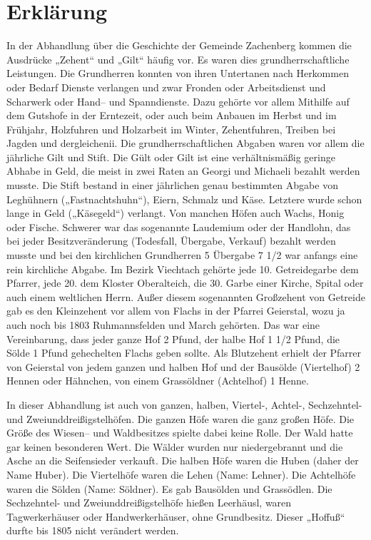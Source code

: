 \documentclass{book}
\begin{document}
\part{Erklärung}

In der Abhandlung über die Geschichte der Gemeinde Zachenberg kommen die
Ausdrücke „Zehent“ und „Gilt“ häufig vor. Es waren dies grundherrschaftliche
Leistungen. Die Grundherren konnten von ihren Untertanen nach Herkommen oder
Bedarf Dienste verlangen und zwar Fronden oder Arbeitsdienst und Scharwerk oder
Hand– und Spanndienste. Dazu gehörte vor allem Mithilfe auf dem Gutshofe in der
Erntezeit, oder auch beim Anbauen im Herbst und im Frühjahr, Holzfuhren und
Holzarbeit im Winter, Zehentfuhren, Treiben bei Jagden und dergleichenii. Die
grundherrschaftlichen Abgaben waren vor allem die jährliche Gilt und Stift. Die
Gült oder Gilt ist eine verhältnismäßig geringe Abhabe in Geld, die meist in
zwei Raten an Georgi und Michaeli bezahlt werden musste. Die Stift bestand in
einer jährlichen genau bestimmten Abgabe von Leghühnern („Fastnachtshuhn“),
Eiern, Schmalz und Käse. Letztere wurde schon lange in Geld („Käsegeld“)
verlangt. Von manchen Höfen auch Wachs, Honig oder Fische. Schwerer war das
sogenannte Laudemium oder der Handlohn, das bei jeder Besitzveränderung
(Todesfall, Übergabe, Verkauf) bezahlt werden musste und bei den kirchlichen
Grundherren 5%
Übergabe 7 1/2 %
war anfangs eine rein kirchliche Abgabe. Im Bezirk Viechtach gehörte jede 10.
Getreidegarbe dem Pfarrer, jede 20. dem Kloster Oberalteich, die 30. Garbe einer
Kirche, Spital oder auch einem weltlichen Herrn. Außer diesem sogenannten
Großzehent von Getreide gab es den Kleinzehent vor allem von Flachs in der
Pfarrei Geierstal, wozu ja auch noch bis 1803 Ruhmannsfelden und March gehörten.
Das war eine Vereinbarung, dass jeder ganze Hof 2 Pfund, der halbe Hof 1 1/2
Pfund, die Sölde 1 Pfund gehechelten Flachs geben sollte. Als Blutzehent erhielt
der Pfarrer von Geierstal von jedem ganzen und halben Hof und der Bausölde
(Viertelhof) 2 Hennen oder Hähnchen, von einem Grassöldner (Achtelhof) 1 Henne.

In dieser Abhandlung ist auch von ganzen, halben, Viertel-, Achtel-,
Sechzehntel- und Zweiunddreißigstelhöfen. Die ganzen Höfe waren die ganz großen
Höfe. Die Größe des Wiesen– und Waldbesitzes spielte dabei keine Rolle. Der Wald
hatte gar keinen besonderen Wert. Die Wälder wurden nur niedergebrannt und die
Asche an die Seifensieder verkauft. Die halben Höfe waren die Huben (daher der
Name Huber). Die Viertelhöfe waren die Lehen (Name: Lehner). Die Achtelhöfe
waren die Sölden (Name: Söldner). Es gab Bausölden und Grassödlen. Die
Sechzehntel- und Zweiunddreißigstelhöfe hießen Leerhäusl, waren Tagwerkerhäuser
oder Handwerkerhäuser, ohne Grundbesitz. Dieser „Hoffuß“ durfte bis 1805 nicht
verändert werden.
\end{document}
